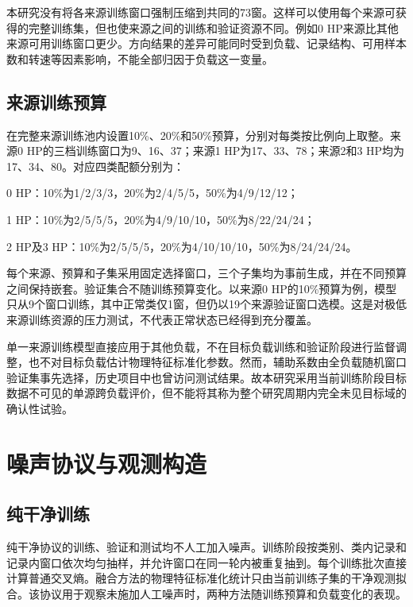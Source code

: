 \documentclass[UTF8,12pt,openany,twoside]{ctexbook}
\numberwithin{equation}{chapter}
\begin{document}
本研究没有将各来源训练窗口强制压缩到共同的73窗。这样可以使用每个来源可获得的完整训练集，但也使来源之间的训练和验证资源不同。例如0 HP来源比其他来源可用训练窗口更少。方向结果的差异可能同时受到负载、记录结构、可用样本数和转速等因素影响，不能全部归因于负载这一变量。

\subsection{来源训练预算}\label{ux6765ux6e90ux8badux7ec3ux9884ux7b97}

在完整来源训练池内设置10\%、20\%和50\%预算，分别对每类按比例向上取整。来源0 HP的三档训练窗口为9、16、37；来源1 HP为17、33、78；来源2和3 HP均为17、34、80。对应四类配额分别为：

0 HP：10\%为1/2/3/3，20\%为2/4/5/5，50\%为4/9/12/12；

1 HP：10\%为2/5/5/5，20\%为4/9/10/10，50\%为8/22/24/24；

2 HP及3 HP：10\%为2/5/5/5，20\%为4/10/10/10，50\%为8/24/24/24。

每个来源、预算和子集采用固定选择窗口，三个子集均为事前生成，并在不同预算之间保持嵌套。验证集合不随训练预算变化。以来源0 HP的10\%预算为例，模型只从9个窗口训练，其中正常类仅1窗，但仍以19个来源验证窗口选模。这是对极低来源训练资源的压力测试，不代表正常状态已经得到充分覆盖。

单一来源训练模型直接应用于其他负载，不在目标负载训练和验证阶段进行监督调整，也不对目标负载估计物理特征标准化参数。然而，辅助系数由全负载随机窗口验证集事先选择，历史项目中也曾访问测试结果。故本研究采用当前训练阶段目标数据不可见的单源跨负载评价，但不能将其称为整个研究周期内完全未见目标域的确认性试验。

\section{噪声协议与观测构造}\label{ux566aux58f0ux534fux8baeux4e0eux89c2ux6d4bux6784ux9020}

\subsection{纯干净训练}\label{ux7eafux5e72ux51c0ux8badux7ec3}

纯干净协议的训练、验证和测试均不人工加入噪声。训练阶段按类别、类内记录和记录内窗口依次均匀抽样，并允许窗口在同一轮内被重复抽到。每个训练批次直接计算普通交叉熵。融合方法的物理特征标准化统计只由当前训练子集的干净观测拟合。该协议用于观察未施加人工噪声时，两种方法随训练预算和负载变化的表现。
\end{document}

